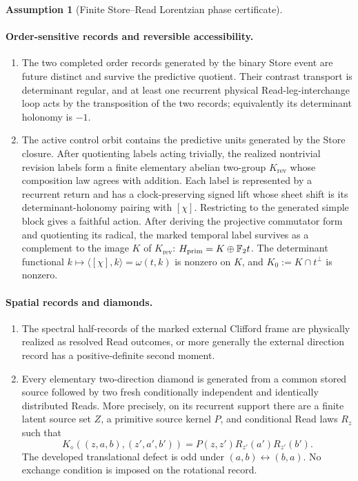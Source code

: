 \documentclass[11pt]{article}
\theoremstyle{definition}
\newtheorem{assumption}[theorem]{Assumption}
\theoremstyle{remark}
\newcommand{\F}{\mathbb F}
\newcommand{\rev}{\mathrm{rev}}
\begin{document}
\begin{assumption}[Finite Store--Read Lorentzian phase certificate]
\paragraph{Order-sensitive records and reversible accessibility.}
\begin{enumerate}[label=\textup{(P\arabic*)},leftmargin=3em,start=6]
\item The two completed order records generated by the binary Store event are
      future distinct and survive the predictive quotient.  Their contrast
      transport is determinant regular, and at least one recurrent physical
      Read-leg-interchange loop acts by the transposition of the two records;
      equivalently its determinant holonomy is $-1$.
\item The active control orbit contains the predictive units generated by the
      Store closure.  After quotienting labels acting trivially, the realized
      nontrivial revision labels form a finite elementary abelian two-group
      $K_{\rev}$ whose composition law agrees with addition.  Each label is
      represented by a recurrent return and has a clock-preserving signed lift
      whose sheet shift is its determinant-holonomy pairing with $[\chi]$.
      Restricting to the generated simple block gives a faithful action.  After
      deriving the projective commutator form and quotienting its radical, the
      marked temporal label survives as a complement to the image $K$ of
      $K_{\rev}$: $H_{\rm prim}=K\oplus\F_2t$.  The determinant functional
      $k\mapsto\langle[\chi],k\rangle=\omega(t,k)$ is nonzero on $K$, and
      $K_0:=K\cap t^\perp$ is nonzero.
\end{enumerate}

\paragraph{Spatial records and diamonds.}
\begin{enumerate}[label=\textup{(P\arabic*)},leftmargin=3em,start=8]
\item The spectral half-records of the marked external Clifford frame are
      physically realized as resolved Read outcomes, or more generally the
      external direction record has a positive-definite second moment.
\item Every elementary two-direction diamond is generated from a common stored
      source followed by two fresh conditionally independent and identically
      distributed Reads.  More precisely, on its recurrent support there are a
      finite latent source set $Z$, a primitive source kernel $P$, and conditional
      Read laws $R_z$ such that
      \[
        K_\diamond((z,a,b),(z',a',b'))
        =P(z,z')R_{z'}(a')R_{z'}(b').
      \]
      The developed translational defect is odd under $(a,b)\leftrightarrow(b,a)$.
      No exchange condition is imposed on the rotational record.
\end{enumerate}
\end{assumption}
\end{document}
